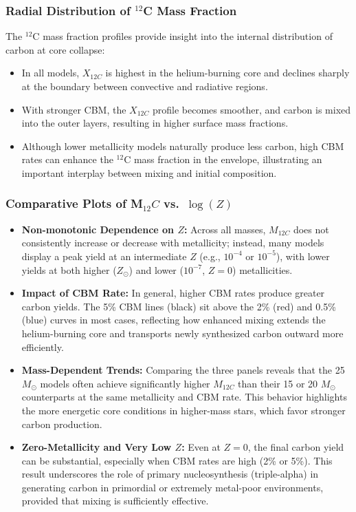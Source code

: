 \subsubsection{Radial Distribution of $^{12}$C Mass Fraction}
The $^{12}$C mass fraction profiles provide insight into the internal distribution of carbon at core collapse:
\begin{itemize}
    \item In all models, $X_{12C}$ is highest in the helium-burning core and declines sharply at the boundary between convective and radiative regions.
    \item With stronger CBM, the $X_{12C}$ profile becomes smoother, and carbon is mixed into the outer layers, resulting in higher surface mass fractions.
    \item Although lower metallicity models naturally produce less carbon, high CBM rates can enhance the $^{12}$C mass fraction in the envelope, illustrating an important interplay between mixing and initial composition.
\end{itemize}

\subsubsection{Comparative Plots of M$_{12}C$ vs.\ $\log(Z)$}

\begin{itemize}
    \item \textbf{Non-monotonic Dependence on $Z$:} 
    Across all masses, $M_{12C}$ does not consistently increase or decrease with metallicity; instead, many models display a peak yield at an intermediate $Z$ (e.g., $10^{-4}$ or $10^{-5}$), with lower yields at both higher ($Z_\odot$) and lower ($10^{-7}$, $Z=0$) metallicities.

    \item \textbf{Impact of CBM Rate:} 
    In general, higher CBM rates produce greater carbon yields. The 5\% CBM lines (black) sit above the 2\% (red) and 0.5\% (blue) curves in most cases, reflecting how enhanced mixing extends the helium-burning core and transports newly synthesized carbon outward more efficiently.

    \item \textbf{Mass-Dependent Trends:} 
    Comparing the three panels reveals that the 25 $M_\odot$ models often achieve significantly higher $M_{12C}$ than their 15 or 20 $M_\odot$ counterparts at the same metallicity and CBM rate. This behavior highlights the more energetic core conditions in higher-mass stars, which favor stronger carbon production.

    \item \textbf{Zero-Metallicity and Very Low $Z$:}
    Even at $Z=0$, the final carbon yield can be substantial, especially when CBM rates are high (2\% or 5\%). This result underscores the role of primary nucleosynthesis (triple-alpha) in generating carbon in primordial or extremely metal-poor environments, provided that mixing is sufficiently effective.
\end{itemize}

